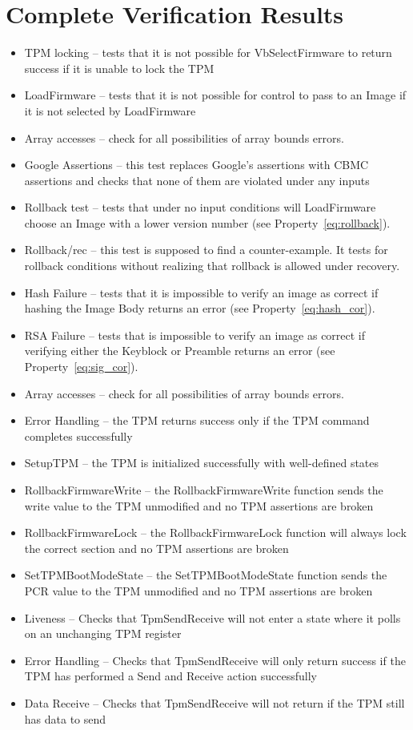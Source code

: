 \section{Complete Verification Results}
\begin{itemize}
 \item  TPM locking -- tests that it is not possible for VbSelectFirmware to return success if it is unable to lock the TPM
 \item  LoadFirmware -- tests that it is not possible for control to pass to an Image if it is not selected by LoadFirmware
 \item  Array accesses -- check for all possibilities of array bounds errors.
 \item  Google Assertions -- this test replaces Google's assertions with CBMC assertions and checks that none of them are violated under any inputs
 \item  Rollback test -- tests that under no input conditions will LoadFirmware choose an Image with a lower version number (see Property~\ref{eq:rollback}).
 \item  Rollback/rec  -- this test is supposed to find a counter-example. It tests for rollback conditions without realizing that rollback is allowed under recovery. 
 \item  Hash Failure -- tests that it is impossible to verify an image as correct if hashing the Image Body returns an error (see Property~\ref{eq:hash_cor}).
 \item  RSA Failure -- tests that is impossible to verify an image as correct if verifying either the Keyblock or Preamble returns an error (see Property~\ref{eq:sig_cor}).
 \item  Array accesses -- check for all possibilities of array bounds errors.
   \item Error Handling --  the TPM returns success only if the TPM command completes successfully
    \item SetupTPM -- the TPM is initialized successfully with well-defined states
    \item  RollbackFirmwareWrite -- the RollbackFirmwareWrite function sends the write value to the TPM unmodified and no TPM assertions are broken
    \item  RollbackFirmwareLock -- the RollbackFirmwareLock function will always lock the correct section and no TPM assertions are broken
    \item SetTPMBootModeState -- the SetTPMBootModeState function sends the PCR value to the TPM unmodified and no TPM assertions are broken
   \item Liveness -- Checks that TpmSendReceive will not enter a state where it polls on an unchanging TPM register
   \item Error Handling -- Checks that TpmSendReceive will only return success if the TPM has performed a Send and Receive action successfully
   \item Data Receive -- Checks that TpmSendReceive will not return if the TPM still has data to send 
\end{itemize}

